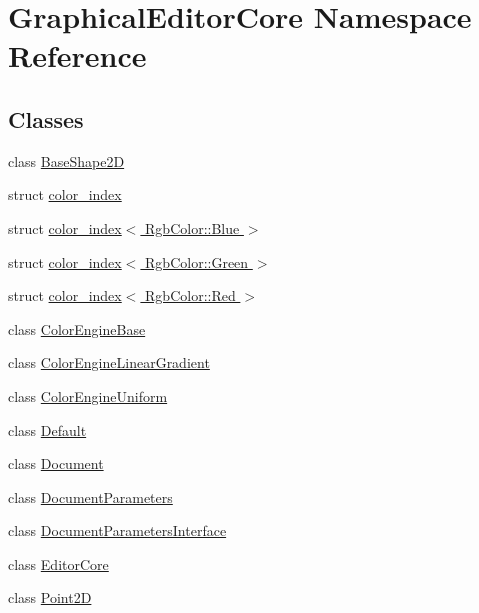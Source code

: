 \hypertarget{namespaceGraphicalEditorCore}{}\section{Graphical\+Editor\+Core Namespace Reference}
\label{namespaceGraphicalEditorCore}
\subsection*{Classes}
\begin{DoxyCompactItemize}
\item 
class \hyperlink{classGraphicalEditorCore_1_1BaseShape2D}{Base\+Shape2D}
\item 
struct \hyperlink{structGraphicalEditorCore_1_1color__index}{color\+\_\+index}
\item 
struct \hyperlink{structGraphicalEditorCore_1_1color__index_3_01RgbColor_1_1Blue_01_4}{color\+\_\+index$<$ Rgb\+Color\+::\+Blue $>$}
\item 
struct \hyperlink{structGraphicalEditorCore_1_1color__index_3_01RgbColor_1_1Green_01_4}{color\+\_\+index$<$ Rgb\+Color\+::\+Green $>$}
\item 
struct \hyperlink{structGraphicalEditorCore_1_1color__index_3_01RgbColor_1_1Red_01_4}{color\+\_\+index$<$ Rgb\+Color\+::\+Red $>$}
\item 
class \hyperlink{classGraphicalEditorCore_1_1ColorEngineBase}{Color\+Engine\+Base}
\item 
class \hyperlink{classGraphicalEditorCore_1_1ColorEngineLinearGradient}{Color\+Engine\+Linear\+Gradient}
\item 
class \hyperlink{classGraphicalEditorCore_1_1ColorEngineUniform}{Color\+Engine\+Uniform}
\item 
class \hyperlink{classGraphicalEditorCore_1_1Default}{Default}
\item 
class \hyperlink{classGraphicalEditorCore_1_1Document}{Document}
\item 
class \hyperlink{classGraphicalEditorCore_1_1DocumentParameters}{Document\+Parameters}
\item 
class \hyperlink{classGraphicalEditorCore_1_1DocumentParametersInterface}{Document\+Parameters\+Interface}
\item 
class \hyperlink{classGraphicalEditorCore_1_1EditorCore}{Editor\+Core}
\item 
class \hyperlink{classGraphicalEditorCore_1_1Point2D}{Point2D}
\end{DoxyCompactItemize}
